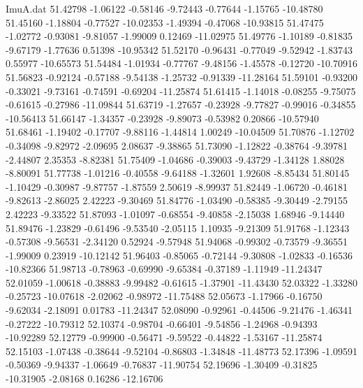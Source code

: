 \begin{filecontents}{ImuA.dat}
  51.42798   -1.06122   -0.58146   -9.72443   -0.77644   -1.15765  -10.48780
  51.45160   -1.18804   -0.77527  -10.02353   -1.49394   -0.47068  -10.93815
  51.47475   -1.02772   -0.93081   -9.81057   -1.99009    0.12469  -11.02975
  51.49776   -1.10189   -0.81835   -9.67179   -1.77636    0.51398  -10.95342
  51.52170   -0.96431   -0.77049   -9.52942   -1.83743    0.55977  -10.65573
  51.54484   -1.01934   -0.77767   -9.48156   -1.45578   -0.12720  -10.70916
  51.56823   -0.92124   -0.57188   -9.54138   -1.25732   -0.91339  -11.28164
  51.59101   -0.93200   -0.33021   -9.73161   -0.74591   -0.69204  -11.25874
  51.61415   -1.14018   -0.08255   -9.75075   -0.61615   -0.27986  -11.09844
  51.63719   -1.27657   -0.23928   -9.77827   -0.99016   -0.34855  -10.56413
  51.66147   -1.34357   -0.23928   -9.89073   -0.53982    0.20866  -10.57940
  51.68461   -1.19402   -0.17707   -9.88116   -1.44814    1.00249  -10.04509
  51.70876   -1.12702   -0.34098   -9.82972   -2.09695    2.08637   -9.38865
  51.73090   -1.12822   -0.38764   -9.39781   -2.44807    2.35353   -8.82381
  51.75409   -1.04686   -0.39003   -9.43729   -1.34128    1.88028   -8.80091
  51.77738   -1.01216   -0.40558   -9.64188   -1.32601    1.92608   -8.85434
  51.80145   -1.10429   -0.30987   -9.87757   -1.87559    2.50619   -8.99937
  51.82449   -1.06720   -0.46181   -9.82613   -2.86025    2.42223   -9.30469
  51.84776   -1.03490   -0.58385   -9.30449   -2.79155    2.42223   -9.33522
  51.87093   -1.01097   -0.68554   -9.40858   -2.15038    1.68946   -9.14440
  51.89476   -1.23829   -0.61496   -9.53540   -2.05115    1.10935   -9.21309
  51.91768   -1.12343   -0.57308   -9.56531   -2.34120    0.52924   -9.57948
  51.94068   -0.99302   -0.73579   -9.36551   -1.99009    0.23919  -10.12142
  51.96403   -0.85065   -0.72144   -9.30808   -1.02833   -0.16536  -10.82366
  51.98713   -0.78963   -0.69990   -9.65384   -0.37189   -1.11949  -11.24347
  52.01059   -1.00618   -0.38883   -9.99482   -0.61615   -1.37901  -11.43430
  52.03322   -1.33280   -0.25723  -10.07618   -2.02062   -0.98972  -11.75488
  52.05673   -1.17966   -0.16750   -9.62034   -2.18091    0.01783  -11.24347
  52.08090   -0.92961   -0.44506   -9.21476   -1.46341   -0.27222  -10.79312
  52.10374   -0.98704   -0.66401   -9.54856   -1.24968   -0.94393  -10.92289
  52.12779   -0.99900   -0.56471   -9.59522   -0.44822   -1.53167  -11.25874
  52.15103   -1.07438   -0.38644   -9.52104   -0.86803   -1.34848  -11.48773
  52.17396   -1.09591   -0.50369   -9.94337   -1.06649   -0.76837  -11.90754
  52.19696   -1.30409   -0.31825  -10.31905   -2.08168    0.16286  -12.16706

\end{filecontents}

